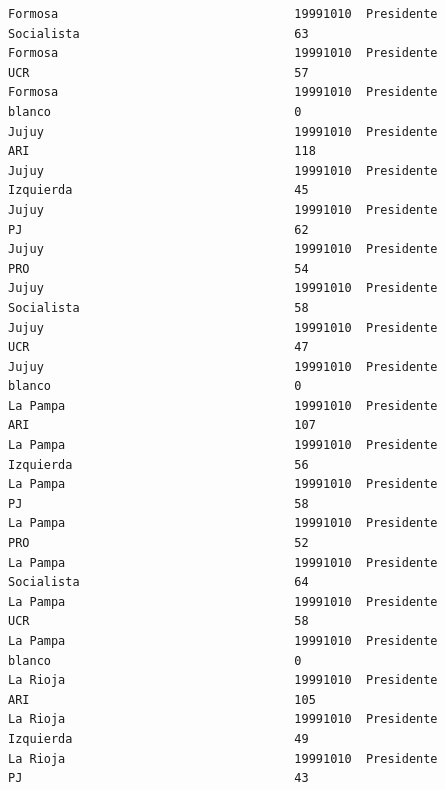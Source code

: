 \documentclass[a4paper,10pt]{article}
\begin{document}
\begin{verbatim}
Formosa                                 19991010  Presidente                    Socialista                              63             
Formosa                                 19991010  Presidente                    UCR                                     57             
Formosa                                 19991010  Presidente                    blanco                                  0              
Jujuy                                   19991010  Presidente                    ARI                                     118            
Jujuy                                   19991010  Presidente                    Izquierda                               45             
Jujuy                                   19991010  Presidente                    PJ                                      62             
Jujuy                                   19991010  Presidente                    PRO                                     54             
Jujuy                                   19991010  Presidente                    Socialista                              58             
Jujuy                                   19991010  Presidente                    UCR                                     47             
Jujuy                                   19991010  Presidente                    blanco                                  0              
La Pampa                                19991010  Presidente                    ARI                                     107            
La Pampa                                19991010  Presidente                    Izquierda                               56             
La Pampa                                19991010  Presidente                    PJ                                      58             
La Pampa                                19991010  Presidente                    PRO                                     52             
La Pampa                                19991010  Presidente                    Socialista                              64             
La Pampa                                19991010  Presidente                    UCR                                     58             
La Pampa                                19991010  Presidente                    blanco                                  0              
La Rioja                                19991010  Presidente                    ARI                                     105            
La Rioja                                19991010  Presidente                    Izquierda                               49             
La Rioja                                19991010  Presidente                    PJ                                      43             

\end{verbatim}
\end{document}
